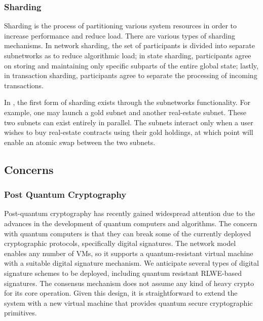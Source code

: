 \documentclass[runningheads]{llncs}
\begin{document}
\subsubsection{Sharding}
Sharding is the process of partitioning various system resources in order to increase performance and reduce load. There are various types of sharding mechanisms. In network sharding, the set of participants is divided into separate subnetworks as to reduce algorithmic load; in state sharding, participants agree on storing and maintaining only specific subparts of the entire global state; lastly, in transaction sharding, participants agree to separate the processing of incoming transactions. 

In \AVAPlatformNameFirstRelease{}, the first form of sharding exists through the subnetworks functionality. For example, one may launch a gold subnet and another real-estate subnet. These two subnets can exist entirely in parallel. The subnets interact only when a user wishes to buy real-estate contracts using their gold holdings, at which point \AVAPlatformName{} will enable an atomic swap between the two subnets. 

\subsection{Concerns}
\subsubsection{Post Quantum Cryptography}
Post-quantum cryptography has recently gained widespread attention due to the advances in the development of quantum computers and algorithms. The concern with quantum computers is that they can break some of the currently deployed cryptographic protocols, specifically digital signatures. 
The \AVAPlatformName{} network model enables any number of VMs, so it supports a quantum-resistant virtual machine with a suitable digital signature mechanism. We anticipate several types of digital signature schemes to be deployed, including quantum resistant RLWE-based signatures. The consensus mechanism does not assume any kind of heavy crypto for its core operation. Given this design, it is straightforward to extend the system with a new virtual machine that provides quantum secure cryptographic primitives.
\end{document}
